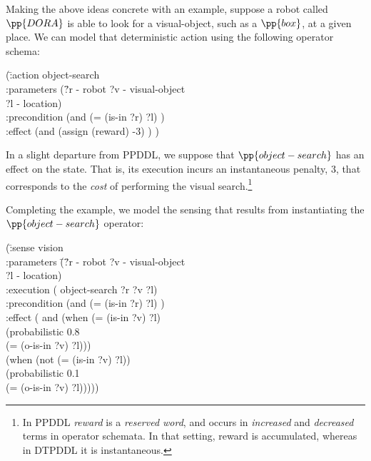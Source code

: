 
Making the above ideas concrete with an example, suppose a robot
called $\pp{DORA}$ is able to look for a visual-object, such as a
$\pp{box}$, at a given place. We can model that deterministic action
using the following operator schema:


\small
\begin{tabtt}
(\=:action object-search \+ \\
   :parameters (\=?r - robot ?v - visual-object\\
   \> ?l - location) \\
   :precondition (and (= (is-in ?r) ?l) ) \\
   :effect (and (assign (reward) -3) ) ) \\
\end{tabtt}
\normalsize


\noindent In a slight departure from PPDDL, we suppose that
$\pp{object-search}$ has an effect on the state. That is, its
execution incurs an instantaneous penalty, $3$, that corresponds to
the {\em cost} of performing the visual search.\footnote{In PPDDL {\em
reward} is a {\em reserved word}, and occurs in {\em increased} and
{\em decreased} terms in operator schemata. In that setting, reward is
accumulated, whereas in DTPDDL it is instantaneous.}

Completing the example, we model the sensing that results from
instantiating the $\pp{object-search}$ operator:

\small
\begin{tabtt}
(\= :sense vision \+\\
 :parameters \= (\= ?r - robot ?v - visual-object\\
 \>\>  ?l - location) \\
 :execution \> ( \> object-search ?r ?v ?l) \\
 :precondition (and (= (is-in ?r) ?l) ) \\
 :effect \>  (  \> and (when (= (is-in ?v) ?l) \\
   \> \> (probabilistic 0.8 \\
   \>  \>(= (o-is-in ?v) ?l))) \\
  \> (when (not (= (is-in ?v) ?l)) \\
   \>  \> (probabilistic 0.1 \\
   \>  \> (= (o-is-in ?v) ?l))))) \\
\end{tabtt}
\normalsize


